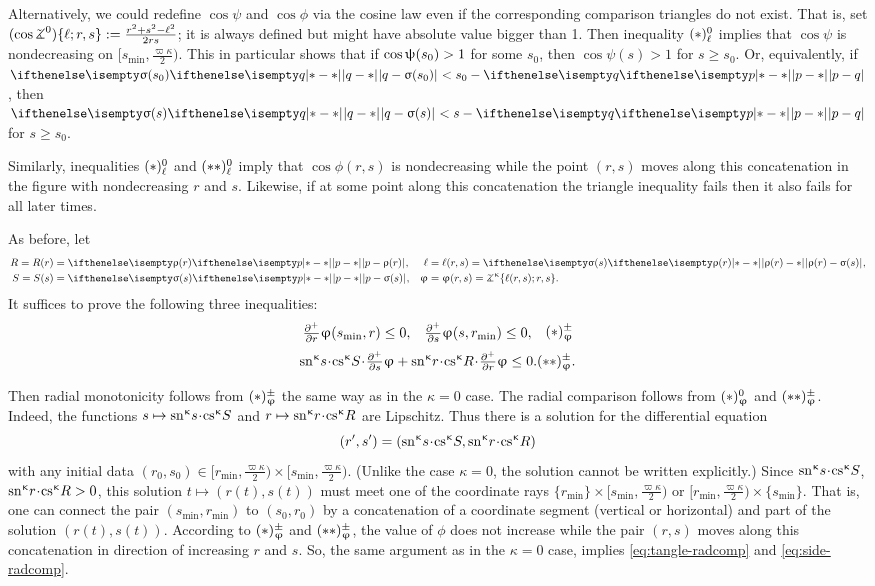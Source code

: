 Alternatively, we could redefine $\cos \psi$ and $\cos \phi$ via 
the cosine law even if the corresponding comparison triangles do not exist.
That is, set $(\cos \tangle\mc0)\{\ell;r,s\}\df\frac{r^2+s^2-\ell^2}{2rs}$; it is 
always defined but might have absolute value bigger than 1. Then inequality $ 
(*)^{0}_\ell$ implies that $\cos \psi$ is nondecreasing  on $  
[s_{\min},\tfrac{\varpi\kappa}2)$.
This in particular shows that 
if  $\cos  \psi(s_0)\z>1$ for some $s_0$, then $\cos  \psi(s)>1$ for 
$s\ge s_0$.
Or, 
equivalently, if $\dist{q}{\sigma(s_0)}{}<s_0-\dist{p}{q}{}$, then
$\dist{q}{\sigma(s)}{}<s-\dist{p}{q}{}$ for $s\ge s_0$.

Similarly,  inequalities $ (*)^{0}_\ell$ and  $ (**)^{0}_\ell$ imply that  $\cos 
\phi(r, s)$ is nondecreasing while the  point $(r,s)$ moves along this 
concatenation in  the figure with nondecreasing $r$ and $s$.
Likewise, if at some point along this concatenation the triangle inequality fails 
then it also fails for all later times.



As before, let
\begin{align*}
R=R(r)&=\dist{p}{\rho(r)}{},&\ell&=\ell(r,s)=\dist{\rho(r)}{\sigma(s)}{},
\\
S=S(s)&=\dist{p}{\sigma(s)}{},&\phi&=\phi(r,s)=\tangle\mc\kappa\{\ell(r,s);r,s\}.
\end{align*}
It suffices to prove the following three inequalities:
\[
\begin{aligned}
&\tfrac{\partial^+}{\partial r}\phi(s_{\min},r)\le 0, 
&
&\tfrac{\partial^+}{\partial s}\phi(s,r_{\min})\le 0,
\end{aligned}
\leqno(*)\mc\pm_\phi
\]
\[
\sn\kappa s\cdot\cs\kappa S\cdot\tfrac{\partial^+}{\partial s}\phi
+
\sn\kappa r\cdot\cs\kappa R\cdot\tfrac{\partial^+}{\partial r}\phi\le 0.
\leqno(**)\mc\pm_\phi.
\]

Then radial monotonicity follows from $(*)^{\pm}_\upvarphi$ the same way as in the $\kappa=0$ case.
The radial comparison follows from $(*)^{0}_\upvarphi$ and $(**)^{\pm}_\upvarphi$.
Indeed, the functions $s\mapsto \sn\kappa s\cdot\cs\kappa S$ and $r\mapsto \sn\kappa r\cdot\cs\kappa R$ are Lipschitz.
Thus there is a solution for the differential equation
\[(r',s')=(\sn\kappa s\cdot\cs\kappa S,\sn\kappa r\cdot\cs\kappa R)\] 
with any initial data $(r_0,s_0)\in[r_{\min},\tfrac{\varpi\kappa}2)\times[s_{\min},\tfrac{\varpi\kappa}2)$.
(Unlike the case $\kappa=0$, the solution cannot be written explicitly.)
Since $\sn\kappa s\cdot\cs\kappa S$, $\sn\kappa r\cdot\cs\kappa R>0$, this solution $t\mapsto(r(t),s(t))$ must meet one of the coordinate rays
$\{r_{\min}\}\times[s_{\min},\tfrac{\varpi\kappa}2)$ or $[r_{\min},\tfrac{\varpi\kappa}2)\times\{s_{\min}\}$.
That is, one can connect the pair $(s_{\min},r_{\min})$ to $(s_0,r_0)$ by a concatenation of a coordinate segment (vertical or horizontal) and part of the solution $(r(t),s(t))$.
According to $(*)^{\pm}_\upvarphi$ and $(**)^{\pm}_\upvarphi$, the value of $\phi$ does not increase while the pair $(r,s)$ moves along this concatenation in direction of increasing $r$ and $s$.
So, the same argument as in the $\kappa=0$ case, implies \ref{eq:tangle-radcomp} and \ref{eq:side-radcomp}.


